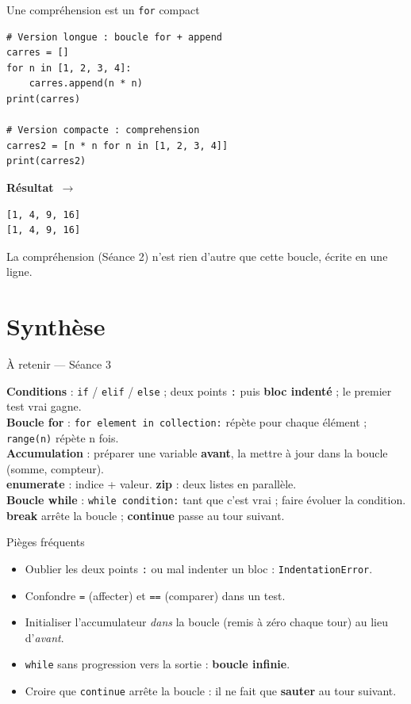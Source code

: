 \documentclass[aspectratio=169,11pt]{beamer}
\newcommand{\resultat}{{\scriptsize\textbf{R\'esultat}~$\rightarrow$}\par\vspace{1pt}}
\begin{document}
\begin{frame}[fragile]{Une compréhension est un \texttt{for} compact}
\begin{lstlisting}
# Version longue : boucle for + append
carres = []
for n in [1, 2, 3, 4]:
    carres.append(n * n)
print(carres)

# Version compacte : comprehension
carres2 = [n * n for n in [1, 2, 3, 4]]
print(carres2)
\end{lstlisting}
\resultat
\begin{lstlisting}[style=out]
[1, 4, 9, 16]
[1, 4, 9, 16]
\end{lstlisting}
{\small La compréhension (Séance 2) n'est rien d'autre que cette boucle, écrite en une ligne.}
\end{frame}

\section{Synthèse}

\begin{frame}{À retenir — Séance 3}
\begin{ucadret}[L'essentiel]
{\small
\textbf{Conditions} : \texttt{if} / \texttt{elif} / \texttt{else} ; deux points \texttt{:} puis \textbf{bloc indenté} ; le premier test vrai gagne.\\[2pt]
\textbf{Boucle for} : \texttt{for element in collection:} répète pour chaque élément ; \texttt{range(n)} répète n fois.\\[2pt]
\textbf{Accumulation} : préparer une variable \textbf{avant}, la mettre à jour dans la boucle (somme, compteur).\\[2pt]
\textbf{enumerate} : indice + valeur. \textbf{zip} : deux listes en parallèle.\\[2pt]
\textbf{Boucle while} : \texttt{while condition:} tant que c'est vrai ; faire évoluer la condition.\\[2pt]
\textbf{break} arrête la boucle ; \textbf{continue} passe au tour suivant.}
\end{ucadret}
\end{frame}

\begin{frame}{Pièges fréquents}
\begin{itemize}\small
  \item Oublier les deux points \texttt{:} ou mal indenter un bloc : \texttt{IndentationError}.
  \item Confondre \texttt{=} (affecter) et \texttt{==} (comparer) dans un test.
  \item Initialiser l'accumulateur \emph{dans} la boucle (remis à zéro chaque tour) au lieu d'\emph{avant}.
  \item \texttt{while} sans progression vers la sortie : \textbf{boucle infinie}.
  \item Croire que \texttt{continue} arrête la boucle : il ne fait que \textbf{sauter} au tour suivant.
\end{itemize}
\end{frame}
\end{document}
